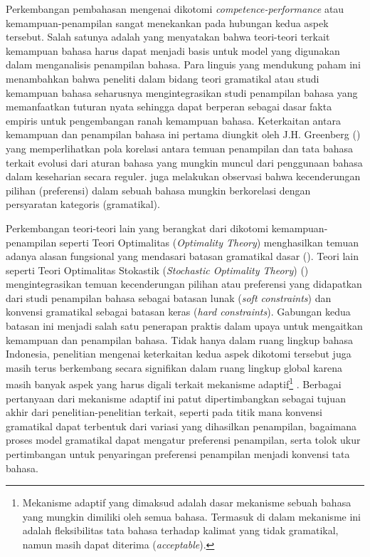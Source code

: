 Perkembangan pembahasan mengenai dikotomi \textit{competence-performance} atau kemampuan-penampilan sangat menekankan pada hubungan kedua aspek tersebut. Salah satunya adalah \cite{sagwasow2011pccg} yang menyatakan bahwa teori-teori terkait kemampuan bahasa harus dapat menjadi basis untuk model yang digunakan dalam menganalisis penampilan bahasa. Para linguis yang mendukung paham ini menambahkan bahwa peneliti dalam bidang teori gramatikal atau studi kemampuan bahasa seharusnya mengintegrasikan studi penampilan bahasa yang memanfaatkan tuturan nyata sehingga dapat berperan sebagai dasar fakta empiris untuk pengembangan ranah kemampuan bahasa. Keterkaitan antara kemampuan dan penampilan bahasa ini pertama diungkit oleh J.H. Greenberg (\citealp{greenberg1963some, greenberg1966language}) yang memperlihatkan pola korelasi antara temuan penampilan dan tata bahasa terkait evolusi dari aturan bahasa yang mungkin muncul dari penggunaan bahasa dalam keseharian secara reguler. \cite{givon1979syntax} juga melakukan observasi bahwa kecenderungan pilihan (preferensi) dalam sebuah bahasa mungkin berkorelasi dengan persyaratan kategoris (gramatikal). 

Perkembangan teori-teori lain yang berangkat dari dikotomi kemampuan-penampilan seperti Teori Optimalitas (\textit{Optimality Theory}) menghasilkan temuan adanya alasan fungsional yang mendasari batasan gramatikal dasar (\citealp{haspelmath1999optimality, aissen1999markedness}). Teori lain seperti Teori Optimalitas Stokastik (\textit{Stochastic Optimality Theory}) (\citealp{bresnan2001soft, manning2003probabilistic}) mengintegrasikan temuan kecenderungan pilihan atau preferensi yang didapatkan dari studi penampilan bahasa  sebagai batasan lunak (\textit{soft constraints}) dan konvensi gramatikal sebagai batasan keras (\textit{hard constraints}).  Gabungan kedua batasan ini menjadi salah satu penerapan praktis dalam upaya untuk mengaitkan kemampuan dan penampilan bahasa. Tidak hanya dalam ruang lingkup bahasa Indonesia, penelitian mengenai keterkaitan kedua aspek dikotomi tersebut juga masih terus berkembang secara signifikan dalam ruang lingkup global karena masih banyak aspek yang harus digali terkait mekanisme adaptif\footnote{Mekanisme adaptif yang dimaksud adalah dasar mekanisme sebuah bahasa yang mungkin dimiliki oleh semua bahasa. Termasuk di dalam mekanisme ini adalah fleksibilitas tata bahasa terhadap kalimat yang tidak gramatikal, namun masih dapat diterima (\textit{acceptable}).} \citep{kirby1999function}. Berbagai pertanyaan dari mekanisme adaptif ini patut dipertimbangkan sebagai tujuan akhir dari penelitian-penelitian terkait, seperti pada titik mana konvensi gramatikal dapat terbentuk dari variasi yang dihasilkan penampilan, bagaimana proses model gramatikal dapat mengatur preferensi penampilan, serta tolok ukur pertimbangan untuk penyaringan preferensi penampilan menjadi konvensi tata bahasa.


